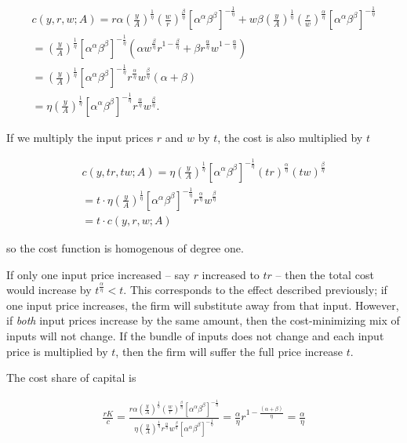 \documentclass{article}
\begin{document}
\begin{enumerate}
	\begin{gather*}
	c(y,r,w;A) = r \alpha \left( \frac{y}{A} \right)^{\frac{1}{\eta}} \left( \frac{w}{r} \right)^{\frac{\beta}{\eta}} [\alpha^\alpha \beta^\beta]^{-\frac{1}{\eta}} + w \beta \left( \frac{y}{A} \right)^{\frac{1}{\eta}} \left( \frac{r}{w} \right)^{\frac{\alpha}{\eta}} [\alpha^\alpha \beta^\beta]^{-\frac{1}{\eta}} \\
	= \left( \frac{y}{A} \right)^{\frac{1}{\eta}} [\alpha^\alpha \beta^\beta]^{-\frac{1}{\eta}} (\alpha w^{\frac{\beta}{\eta}} r^{1 - \frac{\beta}{\eta}} + \beta r^{\frac{\alpha}{\eta}} w^{1 - \frac{\alpha}{\eta}}) \\
	= \left( \frac{y}{A} \right)^{\frac{1}{\eta}} [\alpha^\alpha \beta^\beta]^{-\frac{1}{\eta}} r^{\frac{\alpha}{\eta}} w^{\frac{\beta}{\eta}} (\alpha + \beta) \\
	= \eta \left( \frac{y}{A} \right)^{\frac{1}{\eta}} [\alpha^\alpha \beta^\beta]^{-\frac{1}{\eta}} r^{\frac{\alpha}{\eta}} w^{\frac{\beta}{\eta}}.
	\end{gather*}

	If we multiply the input prices $r$ and $w$ by $t$, the cost is also multiplied by $t$

	\begin{gather*}
	c(y,tr,tw;A) = \eta \left( \frac{y}{A} \right)^{\frac{1}{\eta}} [\alpha^\alpha \beta^\beta]^{-\frac{1}{\eta}} (tr)^{\frac{\alpha}{\eta}} (tw)^{\frac{\beta}{\eta}} \\
	= t \cdot \eta \left( \frac{y}{A} \right)^{\frac{1}{\eta}} [\alpha^\alpha \beta^\beta]^{-\frac{1}{\eta}} r^{\frac{\alpha}{\eta}} w^{\frac{\beta}{\eta}} \\
	= t \cdot c(y,r,w;A)
	\end{gather*}

	so the cost function is homogenous of degree one.

	If only one input price increased -- say $r$ increased to $tr$ -- then the total cost would increase by $t^{\frac{\alpha}{\eta}} < t$. This corresponds to the effect described previously; if one input price increases, the firm will substitute away from that input. However, if \textit{both} input prices increase by the same amount, then the cost-minimizing mix of inputs will not change. If the bundle of inputs does not change and each input price is multiplied by $t$, then the firm will suffer the full price increase $t$.

	The cost share of capital is

	\begin{align*}
	\frac{rK}{c} = \frac{r \alpha \left( \frac{y}{A} \right)^{\frac{1}{\eta}} \left( \frac{w}{r} \right)^{\frac{\beta}{\eta}} [\alpha^\alpha \beta^\beta]^{-\frac{1}{\eta}} }{ \eta \left( \frac{y}{A} \right)^{\frac{1}{\eta}} r^{\frac{\alpha}{\eta}} w^{\frac{\beta}{\eta}} [\alpha^\alpha \beta^\beta]^{-\frac{1}{\eta}} } = \frac{\alpha}{\eta} r^{1 - \frac{(\alpha + \beta)}{\eta}} = \frac{\alpha}{\eta} 
	\end{align*}


\end{enumerate}
\end{document}
